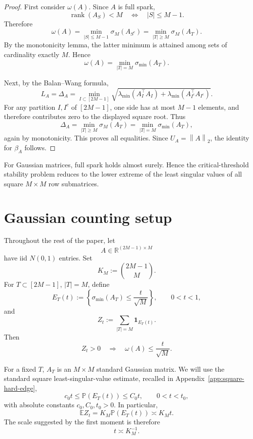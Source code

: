 \documentclass[11pt]{article}
\DeclareMathOperator{\rank}{rank}
\newcommand{\R}{\mathbb R}
\newcommand{\Pbb}{\mathbb P}
\newcommand{\Ebb}{\mathbb E}
\newcommand{\1}{\mathbf 1}
\newcommand{\norm}[1]{\left\lVert #1\right\rVert}
\newcommand{\smin}{\sigma_{\min}}
\begin{document}
\begin{proof}
First consider \(\omega(A)\).  Since \(A\) is full spark,
\[
        \rank(A_S)<M
        \quad\Longleftrightarrow\quad
        |S|\le M-1.
\]
Therefore
\[
        \omega(A)
        =
        \min_{|S|\le M-1}\sigma_M(A_{S^c})
        =
        \min_{|T|\ge M}\sigma_M(A_T).
\]
By the monotonicity lemma, the latter minimum is attained among sets of cardinality
exactly \(M\). Hence
\[
        \omega(A)=\min_{|T|=M}\smin(A_T).
\]

Next, by the Balan--Wang formula,
\[
        L_A=\Delta_A
        =
        \min_{I\subset[2M-1]}
        \sqrt{
        \lambda_{\min}(A_I^\top A_I)
        +
        \lambda_{\min}(A_{I^c}^\top A_{I^c})
        }.
\]
For any partition \(I,I^c\) of \([2M-1]\), one side has at most \(M-1\) elements, and
therefore contributes zero to the displayed square root.  Thus
\[
        \Delta_A
        =
        \min_{|T|\ge M}\sigma_M(A_T)
        =
        \min_{|T|=M}\smin(A_T),
\]
again by monotonicity.  This proves all equalities.  Since \(U_A=\norm{A}_2\), the
identity for \(\beta_A\) follows.
\end{proof}

For Gaussian matrices, full spark holds almost surely.  Hence the critical-threshold
stability problem reduces to the lower extreme of the least singular values of all square
\(M\times M\) row submatrices.

\section{Gaussian counting setup}
\label{sec:counting}

Throughout the rest of the paper, let
\[
        A\in\R^{(2M-1)\times M}
\]
have iid \(N(0,1)\) entries.  Set
\[
        K_M:=\binom{2M-1}{M}.
\]
For \(T\subset[2M-1]\), \(|T|=M\), define
\[
        E_T(t)
        :=
        \left\{
        \smin(A_T)\le \frac{t}{\sqrt M}
        \right\},
        \qquad
        0<t<1,
\]
and
\[
        Z_t:=\sum_{|T|=M}\1_{E_T(t)}.
\]
Then
\[
        Z_t>0
        \quad\Longrightarrow\quad
        \omega(A)\le \frac{t}{\sqrt M}.
\]

For a fixed \(T\), \(A_T\) is an \(M\times M\) standard Gaussian matrix.  We will use the standard square least-singular-value estimate, recalled in Appendix~\ref{app:square-hard-edge},
\begin{equation}
        c_0 t
        \le
        \Pbb(E_T(t))
        \le
        C_0 t,
        \qquad 0<t<t_0,
        \label{eq:square-tail}
\end{equation}
with absolute constants \(c_0,C_0,t_0>0\).  In particular,
\[
        \Ebb Z_t=K_M\Pbb(E_T(t))\asymp K_M t.
\]
The scale suggested by the first moment is therefore
\[
        t\asymp K_M^{-1}.
\]
\end{document}
